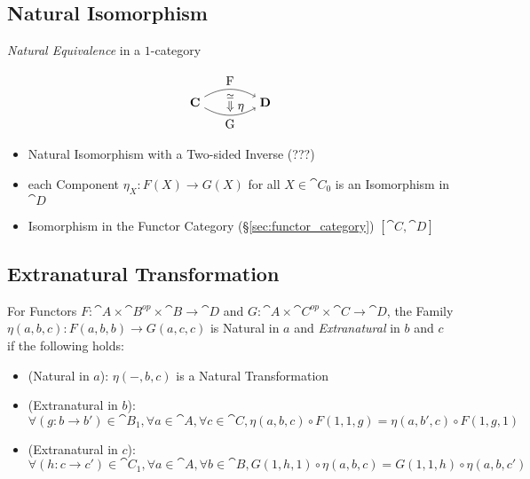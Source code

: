 \subsection{Natural Isomorphism}\label{sec:natural_isomorphism}

\emph{Natural Equivalence} in a $1$-category %

\[
  \begin{tikzpicture}
    \node (C) at (-1,0) {$\cat{C}$};
    \node (D) at (1,0) {$\cat{D}$};
    \node (N) at (0,0) {$\;\;\;\stackrel{\simeq}{\Downarrow}\eta$};
    \draw[->,bend left] (C) to node [above] {F} (D);
    \draw[->,bend right] (C) to node [below] {G} (D);
  \end{tikzpicture}
\]

\begin{itemize}
  \item Natural Isomorphism with a Two-sided Inverse (???)
  \item each Component $\eta_X : F(X) \rightarrow G(X)$ for all $X
    \in \cat{C}_0$ is an Isomorphism in $\cat{D}$
  \item Isomorphism in the Functor Category
    (\S\ref{sec:functor_category}) $[\cat{C},\cat{D}]$
\end{itemize}



\subsection{Extranatural Transformation}
\label{sec:extranatural_transformation}

For Functors $F : \cat{A} \times \cat{B}^{op} \times \cat{B}
\rightarrow \cat{D}$ and $G : \cat{A} \times \cat{C}^{op} \times
\cat{C} \rightarrow \cat{D}$, the Family $\eta(a,b,c) : F(a,b,b)
\rightarrow G(a,c,c)$ is Natural in $a$ and \emph{Extranatural} in $b$
and $c$ if the following holds:
\begin{itemize}
  \item (Natural in $a$): $\eta (-,b,c)$ is a Natural Transformation
  \item (Extranatural in $b$): $\forall (g:b \rightarrow b') \in
    \cat{B}_1, \forall a \in \cat{A}, \forall c \in \cat{C},
    \eta(a,b,c) \circ F(1,1,g) = \eta(a,b',c) \circ F(1,g,1)$
  \item (Extranatural in $c$): $\forall (h:c \rightarrow c') \in
    \cat{C}_1, \forall a \in \cat{A}, \forall b \in \cat{B}, G(1,h,1)
    \circ \eta(a,b,c) = G(1,1,h) \circ \eta(a,b,c')$
\end{itemize}



